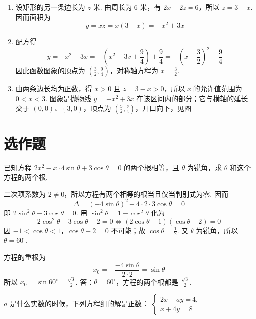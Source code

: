 \begin{solution}
\begin{enumerate}
\item
设矩形的另一条边长为 \(z\text{ 米}\). 由周长为 \(6\text{ 米}\)，有 \(2x+2z=6\)，所以 \(z=3-x\). 因而面积为
\[
y=xz=x(3-x)=-x^{2}+3x
\]

\item
配方得
\[
y=-x^{2}+3x=-\left(x^{2}-3x+\frac94\right)+\frac94=-\left(x-\frac32\right)^{2}+\frac94
\]
因此函数图象的顶点为 \(\left(\frac32,\frac94\right)\)，对称轴方程为 \(x=\frac32\).

\item
由两条边长均为正数，得 \(x>0\) 且 \(z=3-x>0\)，所以 \(x\) 的允许值范围为 \(0<x<3\). 图象是抛物线 \(y=-x^{2}+3x\) 在该区间内的部分；它与横轴的延长交于 \((0,0)\)、\((3,0)\)，顶点为 \(\left(\frac32,\frac94\right)\)，开口向下，见图.
\end{enumerate}

\end{solution}

\section{选作题}

\begin{problem}
已知方程 \(2x^{2}-x\cdot4\sin\theta+3\cos\theta=0\) 的两个根相等，且 \(\theta\) 为锐角，求 \(\theta\) 和这个方程的两个根.
\end{problem}

\begin{solution}
二次项系数为 \(2\neq0\)，所以方程有两个相等的根当且仅当判别式为零. 因而
\[
\Delta=(-4\sin\theta)^2-4\cdot2\cdot3\cos\theta=0
\]
即 \(2\sin^2\theta-3\cos\theta=0\). 用 \(\sin^2\theta=1-\cos^2\theta\) 化为
\[
2\cos^2\theta+3\cos\theta-2=0
\Longleftrightarrow(2\cos\theta-1)(\cos\theta+2)=0
\]
因 \(-1<\cos\theta<1\)，\(\cos\theta+2=0\) 不可能；故 \(\cos\theta=\frac12\). 又 \(\theta\) 为锐角，所以 \(\theta=60^{\circ}\).

方程的重根为
\[
x_0=-\frac{-4\sin\theta}{2\cdot2}=\sin\theta
\]
所以 \(x_0=\sin60^{\circ}=\frac{\sqrt3}{2}\). 答：\(\theta=60^{\circ}\)，方程的两个根都是 \(\frac{\sqrt3}{2}\).
\end{solution}

\begin{problem}
\(a\) 是什么实数的时候，下列方程组的解是正数：
\(
\begin{cases}
2x+ay=4,\\
x+4y=8
\end{cases}
\)
\end{problem}

